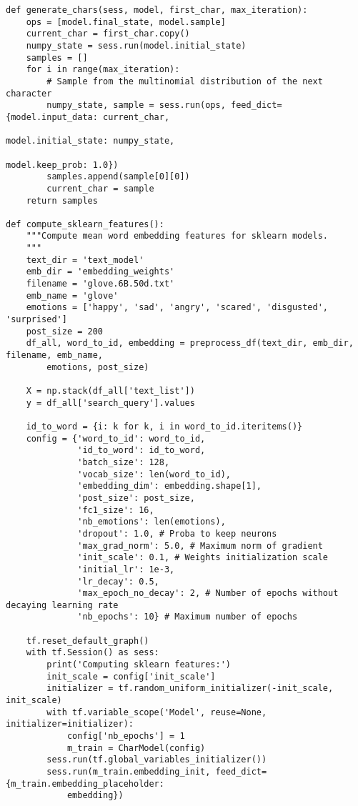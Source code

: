 \begin{lstlisting}
def generate_chars(sess, model, first_char, max_iteration):
    ops = [model.final_state, model.sample]
    current_char = first_char.copy()
    numpy_state = sess.run(model.initial_state)
    samples = []
    for i in range(max_iteration):
        # Sample from the multinomial distribution of the next character
        numpy_state, sample = sess.run(ops, feed_dict={model.input_data: current_char,
                                                       model.initial_state: numpy_state,
                                                       model.keep_prob: 1.0})
        samples.append(sample[0][0])
        current_char = sample
    return samples

def compute_sklearn_features():
    """Compute mean word embedding features for sklearn models.
    """
    text_dir = 'text_model'
    emb_dir = 'embedding_weights'
    filename = 'glove.6B.50d.txt'
    emb_name = 'glove'
    emotions = ['happy', 'sad', 'angry', 'scared', 'disgusted', 'surprised']
    post_size = 200
    df_all, word_to_id, embedding = preprocess_df(text_dir, emb_dir, filename, emb_name, 
        emotions, post_size)

    X = np.stack(df_all['text_list'])
    y = df_all['search_query'].values

    id_to_word = {i: k for k, i in word_to_id.iteritems()}
    config = {'word_to_id': word_to_id,
              'id_to_word': id_to_word,
              'batch_size': 128,
              'vocab_size': len(word_to_id),
              'embedding_dim': embedding.shape[1],
              'post_size': post_size,
              'fc1_size': 16,
              'nb_emotions': len(emotions),
              'dropout': 1.0, # Proba to keep neurons
              'max_grad_norm': 5.0, # Maximum norm of gradient
              'init_scale': 0.1, # Weights initialization scale
              'initial_lr': 1e-3,
              'lr_decay': 0.5,
              'max_epoch_no_decay': 2, # Number of epochs without decaying learning rate
              'nb_epochs': 10} # Maximum number of epochs
    
    tf.reset_default_graph()
    with tf.Session() as sess:
        print('Computing sklearn features:')
        init_scale = config['init_scale']
        initializer = tf.random_uniform_initializer(-init_scale, init_scale)    
        with tf.variable_scope('Model', reuse=None, initializer=initializer):
            config['nb_epochs'] = 1
            m_train = CharModel(config)
        sess.run(tf.global_variables_initializer())
        sess.run(m_train.embedding_init, feed_dict={m_train.embedding_placeholder: 
            embedding})


\end{lstlisting}

